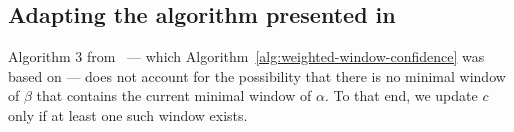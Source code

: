 \subsection{Adapting the algorithm presented in~\citep{cule2014marbles}}

Algorithm 3 from~\citep{cule2014marbles} --- which Algorithm~\ref{alg:weighted-window-confidence} was based on --- does not account for the possibility that there is no minimal window of $ \beta $ that contains the current minimal window of $ \alpha $. To that end, we update $ c $ only if at least one such window exists.
